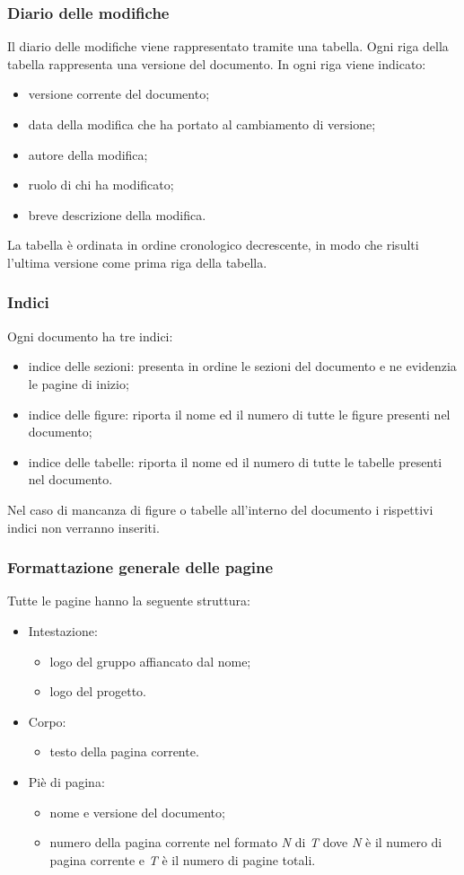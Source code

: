 \subsubsection{Diario delle modifiche}
Il diario delle modifiche viene rappresentato tramite una tabella. Ogni riga della tabella rappresenta una versione del documento. In ogni riga viene indicato: 
\begin{itemize}
	\item versione corrente del documento; 
	\item data della modifica che ha portato al cambiamento di versione; 
	\item autore della modifica;
	\item ruolo di chi ha modificato; 
	\item breve descrizione della modifica. 
\end{itemize}
La tabella è ordinata in ordine cronologico decrescente, in modo che risulti l'ultima versione come prima riga della tabella.

\subsubsection{Indici}
Ogni documento ha tre indici: 
\begin{itemize}
	\item indice delle sezioni: presenta in ordine le sezioni del documento e ne evidenzia le pagine di inizio;
	\item indice delle figure: riporta il nome ed il numero di tutte le figure presenti nel documento;
	\item indice delle tabelle: riporta il nome ed il numero di tutte le tabelle presenti nel documento.
\end{itemize}
Nel caso di mancanza di figure o tabelle all'interno del documento i rispettivi indici non verranno inseriti.

\subsubsection{Formattazione generale delle pagine}
Tutte le pagine hanno la seguente struttura:
\begin{itemize}
	\item Intestazione:
	\begin{itemize}
		\item logo del gruppo affiancato dal nome;
		\item logo del progetto.
	\end{itemize}
		\item Corpo:
		\begin{itemize}
			\item testo della pagina corrente.
		\end{itemize}
	\item Piè di pagina:
	\begin{itemize}
		\item nome e versione del documento;
		\item numero della pagina corrente nel formato \textit{N} di \textit{T} dove \textit{N} è il numero di pagina corrente e \textit{T} è il numero di pagine totali.
	\end{itemize}
\end{itemize}

